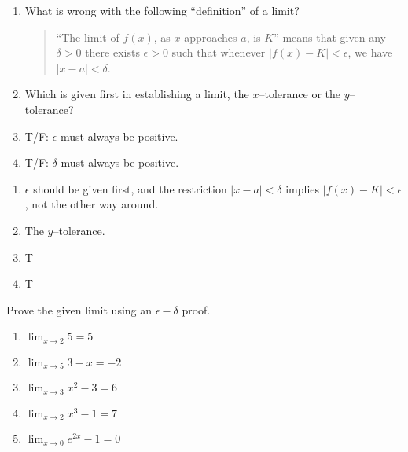 \begin{enumialphparenastyle}


\begin{ex}
\begin{enumerate}
\item {What is wrong with the following ``definition'' of a limit?
	\begin{quote}
``The limit of $f(x)$, as $x$ approaches $a$, is $K$'' means that given any $\delta>0$ there exists $\epsilon>0$ such that whenever $|f(x)-K|< \epsilon$, we have $|x-a|<\delta$.
	\end{quote}
}

\item {Which is given first in establishing a limit, the $x$--tolerance or the $y$--tolerance?}

\item {T/F: $\epsilon$ must always be positive.}

\item {T/F: $\delta$ must always be positive.}
\end{enumerate}

\begin{sol}
\begin{enumerate}
\item {$\epsilon$ should be given first, and the restriction 	$|x-a|<\delta$ implies $|f(x)-K|< \epsilon$, not the other way around.}
\item {The $y$--tolerance.}
\item {T}
\item 
{T}
\end{enumerate}
\end{sol}

\end{ex}
\begin{ex}
Prove the given limit using an $\epsilon - \delta$ proof.
\begin{enumerate}

\item {$\displaystyle \lim_{x\to 2} 5 = 5$}

\item {$\displaystyle \lim_{x\to 5} 3-x = -2$}

\item {$\displaystyle \lim_{x\to 3} x^2-3 = 6$}

\item {$\displaystyle \lim_{x\to 2} x^3-1 = 7$}
\item {$\displaystyle \lim_{x\to 0} e^{2x}-1 = 0$}


\end{enumerate}
\end{ex}
\end{enumialphparenastyle}

